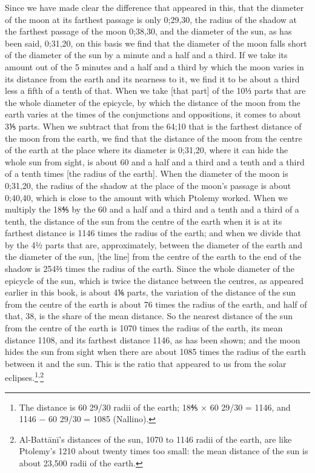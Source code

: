 \documentclass[11pt]{article}
\newcommand{\ArPage}[1]{\marginpar{\footnotesize\color{gray}Ar.\,p.\,#1}}
\begin{document}
\par \ArPage{92}Since we have made clear the difference that appeared in this, that the diameter of the moon at its farthest passage is only 0;29,30, the radius of the shadow at the farthest passage of the moon 0;38,30, and the diameter of the sun, as has been said, 0;31,20, on this basis we find that the diameter of the moon falls short of the diameter of the sun by a minute and a half and a third. If we take its amount out of the 5 minutes and a half and a third by which the moon varies in its distance from the earth and its nearness to it, we find it to be about a third less a fifth of a tenth of that. When we take [that part] of the 10⅓ parts that are the whole diameter of the epicycle, by which the distance of the moon from the earth varies at the times of the conjunctions and oppositions, it comes to about 3⅕ parts. When we subtract that from the 64;10 that is the farthest distance of the moon from the earth, we find that the distance of the moon from the centre of the earth at the place where its diameter is 0;31,20, where it can hide the whole sun from sight, is about 60 and a half and a third and a tenth and a third of a tenth times [the radius of the earth]. When the diameter of the moon is 0;31,20, the radius of the shadow at the place of the moon's passage is about 0;40,40, which is close to the amount with which Ptolemy worked. When we multiply the 18⅘ by the 60 and a half and a third and a tenth and a third of a tenth, the distance of the sun from the centre of the earth when it is at its farthest distance is 1146 times the radius of the earth; and when we divide that by the 4½ parts that are, approximately, between the diameter of the earth and the diameter of the sun, [the line] from the centre of the earth to the end of the shadow is 254⅔ times the radius of the earth. Since the whole diameter of the epicycle of the sun, which is twice the distance between the centres, as appeared earlier in this book, is about 4⅙ parts, the variation of the distance of the sun from the centre of the earth is about 76 times the radius of the earth, and half of that, 38, is the share of the mean distance. So the nearest distance of the sun from the centre of the earth is 1070 times the radius of the earth, its mean distance 1108, and its farthest distance 1146, as has been shown; and the moon hides the sun from sight when there are about 1085 times the radius of the earth between it and the sun. This is the ratio that appeared to us from the solar eclipses.\footnote{The distance is 60 29/30 radii of the earth; 18⅘ × 60 29/30 = 1146, and 1146 − 60 29/30 = 1085 (Nallino).}\textsuperscript{,}\footnote{Al-Battānī's distances of the sun, 1070 to 1146 radii of the earth, are like Ptolemy's 1210 about twenty times too small: the mean distance of the sun is about 23,500 radii of the earth.}\par
\end{document}
